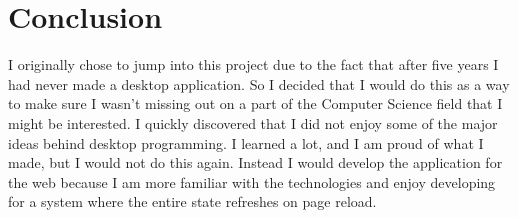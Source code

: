 \documentclass[10pt]{article}
\begin{document}
\section{Conclusion}

I originally chose to jump into this project due to the fact that after five years I had never made a desktop application. So I decided that I would do this as a way to make sure I wasn't missing out on a part of the Computer Science field that I might be interested. I quickly discovered that I did not enjoy some of the major ideas behind desktop programming. I learned a lot, and I am proud of what I made, but I would not do this again. Instead I would develop the application for the web because I am more familiar with the technologies and enjoy developing for a system where the entire state refreshes on page reload.

\newpage
\singlespacing
{}
\nocite{*}


\end{document}
